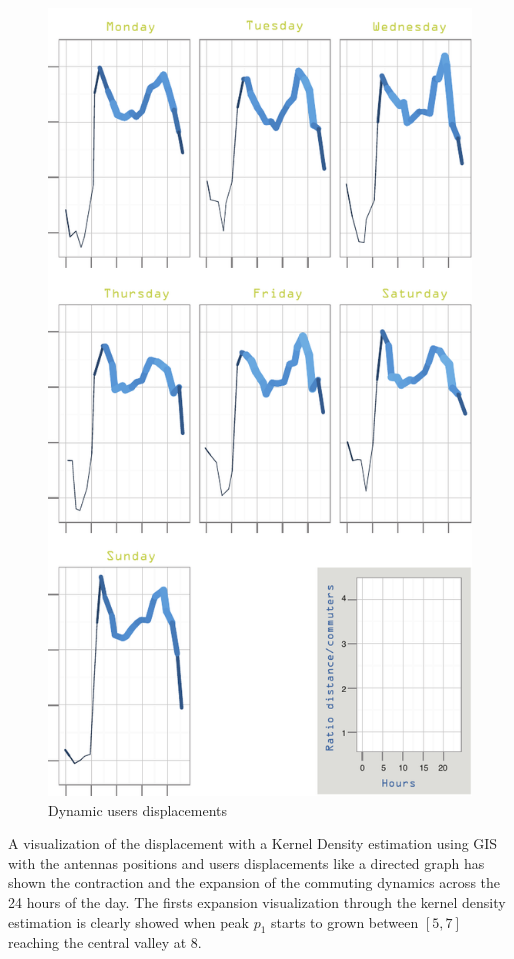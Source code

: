 \begin{figure}[h]
\begin{center}
\includegraphics[scale = 0.8] {results/images/commuting_results.pdf}
\caption{Dynamic users displacements}
\label{fig:dynamic_displacements}
\end{center}
\end{figure}

A visualization of the displacement with a Kernel Density estimation using GIS with the antennas positions and users displacements like a directed graph has shown the contraction and the expansion of the commuting dynamics across the 24 hours of the day. The firsts expansion visualization through the kernel density estimation is clearly showed when peak $p_1$ starts to grown between $[5,7]$ reaching the central valley at $8$.

